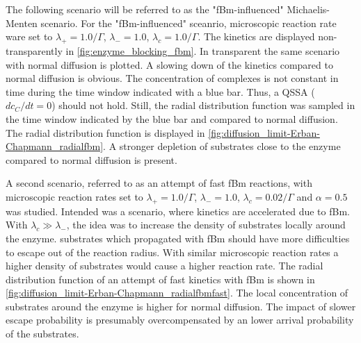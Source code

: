 \documentclass[
  a4paper,BCOR10mm,twoside,
  headsepline,footsepline,%
  fleqn,openbib
]{scrbook}
\begin{document}
The following scenario will be referred to as the "fBm-influenced" Michaelis-Menten scenario. For the "fBm-influenced" sceanrio, microscopic reaction rate ware set to  $\lambda_+=1.0/\Gamma$, $\lambda_-=1.0$,  $\lambda_c=1.0/\Gamma$. The kinetics are displayed non-transparently in \cref{fig:enzyme_blocking_fbm}. In transparent the same scenario with normal diffusion is plotted. A slowing down of the kinetics compared to normal diffusion is obvious. The concentration of complexes is not constant in time during the time window indicated with a blue bar. Thus, a QSSA ($dc_C/dt=0$) should not hold. Still, the radial distribution function was sampled in the time window indicated by the blue bar and compared to normal diffusion. The radial distribution function is displayed in \cref{fig:diffusion_limit-Erban-Chapmann_radialfbm}. A stronger depletion of substrates close to the enzyme compared to normal diffusion is present. \par
A second scenario, referred to as an attempt of fast fBm reactions, with microscopic reaction rates set to  $\lambda_+=1.0/\Gamma$, $\lambda_-=1.0$,  $\lambda_c=0.02/\Gamma$  and $\alpha=0.5$ was studied. Intended was a scenario, where kinetics are accelerated due to fBm. With $\lambda_c \gg\lambda_-$, the idea was to increase the density of substrates locally around the enzyme. substrates which propagated with fBm should have more difficulties to escape out of the reaction radius. With similar microscopic reaction rates a higher density of substrates would cause a higher reaction rate. The radial distribution function of an attempt of fast kinetics with fBm is shown in \cref{fig:diffusion_limit-Erban-Chapmann_radialfbmfast}. The local concentration of substrates around the enzyme is higher for normal diffusion. The impact of slower escape probability is presumably overcompensated by an lower arrival probability of the substrates.
\newpage
\end{document}
